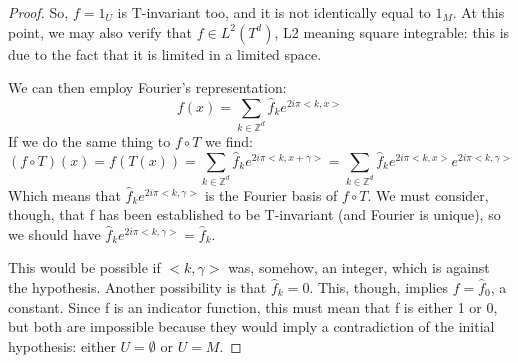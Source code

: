 \begin{proof}
    So, $f=1_U$ is T-invariant too, and it is not identically equal to $1_M$. At this point, we may also verify that $f\in L^2(T^d)$, L2 meaning square integrable: this is due to the fact that it is limited in a limited space. 
    
    We can then employ Fourier's representation: \begin{equation*}
    f(x)=\sum_{k\in\mathbb{Z}^d}\hat{f}_ke^{2i\pi<k, x>}
    \end{equation*}
    If we do the same thing to $f\circ T$ we find:
    \begin{equation*}
        (f\circ T)(x)=f(T(x))=\sum_{k\in\mathbb{Z}^d}\hat{f}_ke^{2i\pi<k, x+\gamma>}=\sum_{k\in\mathbb{Z}^d}\hat{f}_ke^{2i\pi<k, x>}e^{2i\pi<k, \gamma>}
    \end{equation*}
    Which means that $\hat{f}_ke^{2i\pi<k, \gamma>}$ is the Fourier basis of $f\circ T$. We must consider, though, that f has been established to be T-invariant (and Fourier is unique), so we should have $\hat{f}_ke^{2i\pi<k, \gamma>}=\hat{f}_k$. 

    This would be possible if $<k, \gamma>$ was, somehow, an integer, which is against the hypothesis. Another possibility is that $\hat{f}_k=0$. This, though, implies $f=\hat{f}_0$, a constant. Since f is an indicator function, this must mean that f is either 1 or 0, but both are impossible because they would imply a contradiction of the initial hypothesis: either $U=\emptyset$ or $U=M$.
\end{proof}


